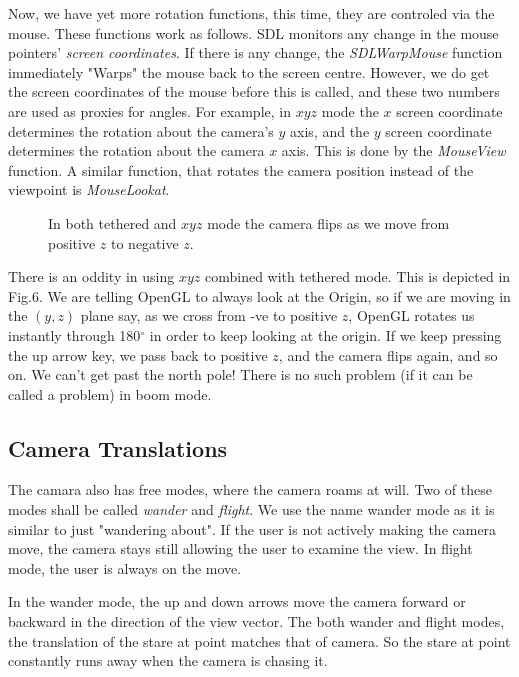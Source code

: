 \documentclass[12pt]{article}
\begin{document}
Now, we have yet more rotation functions, this time, they are controled via
the mouse. These functions work as follows. SDL monitors any change in the 
mouse pointers' {\it screen coordinates}. If there is any change, the {\it SDLWarpMouse}
function immediately "Warps" the mouse back to the screen centre. However,
 we do get the screen coordinates of the mouse before this is called, and these
two numbers are used as proxies for angles. For example, in $xyz$ mode
the $x$ screen coordinate determines
the rotation about the camera's $y$ axis, and the $y$ screen coordinate determines
the rotation about the camera $x$ axis. This is done by the {\it MouseView} function.
A similar function, that rotates the camera position instead of the viewpoint is
{\it MouseLookat}.

\begin{figure}[htb]
\vspace*{10cm}
\caption{ 
In both tethered and  $xyz$ mode the camera flips as we move from positive
$z$ to negative $z$.
}
\end{figure}
There is an oddity in using $xyz$ combined with tethered  mode. This is depicted 
in Fig.6. We are telling
OpenGL to always look at the Origin, so if we are moving in the $(y,z)$ plane say,
 as we cross from -ve to positive $z$, OpenGL rotates us instantly through 180$^\circ$
in order to keep looking at the origin. If we keep pressing the up arrow key, we pass back
to positive $z$, and the camera flips again, and so on. We can't get past
the north pole! There is no such problem (if it can be called a problem) 
in boom mode.

\subsection{Camera Translations}

The camara also has free modes, where the camera roams at will.
Two of these modes shall be called {\it wander} and {\it flight}.
We use the name wander mode as it is similar to just "wandering about".
If the user is not actively making the camera move, the camera stays
still allowing the user to examine the view. In flight mode, the user
is always on the move.

In the wander mode, the up and down arrows move the camera forward
or backward in the direction of the view vector. The both
wander and flight modes, the  translation
of the stare at point matches that of camera. So the stare at point 
constantly runs away when the camera is chasing it.
\end{document}
